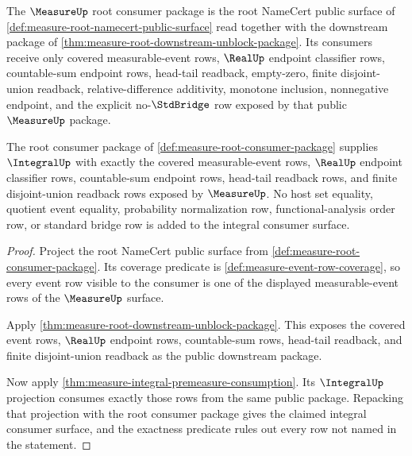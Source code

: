 \begin{definition}
\label{def:measure-root-consumer-package}
The $\MeasureUp$ root consumer package is the root NameCert public surface of
\autoref{def:measure-root-namecert-public-surface} read together with the
downstream package of
\autoref{thm:measure-root-downstream-unblock-package}. Its consumers receive
only covered measurable-event rows, $\RealUp$ endpoint classifier rows,
countable-sum endpoint rows, head-tail readback, empty-zero, finite
disjoint-union readback, relative-difference additivity, monotone inclusion,
nonnegative endpoint, and the explicit no-$\StdBridge$ row exposed by that
public $\MeasureUp$ package.
\end{definition}

\begin{theorem}
\label{thm:measure-integral-consumer-rows}
The root consumer package of
\autoref{def:measure-root-consumer-package} supplies $\IntegralUp$ with
exactly the covered measurable-event rows, $\RealUp$ endpoint classifier rows,
countable-sum endpoint rows, head-tail readback rows, and finite
disjoint-union readback rows exposed by $\MeasureUp$. No host set equality,
quotient event equality, probability normalization row, functional-analysis
order row, or standard bridge row is added to the integral consumer surface.
\end{theorem}
\begin{proof}
Project the root NameCert public surface from
\autoref{def:measure-root-consumer-package}. Its coverage predicate is
\autoref{def:measure-event-row-coverage}, so every event row visible to the
consumer is one of the displayed measurable-event rows of the $\MeasureUp$
surface.

Apply \autoref{thm:measure-root-downstream-unblock-package}. This exposes the
covered event rows, $\RealUp$ endpoint rows, countable-sum rows, head-tail
readback, and finite disjoint-union readback as the public downstream package.

Now apply \autoref{thm:measure-integral-premeasure-consumption}. Its
$\IntegralUp$ projection consumes exactly those rows from the same public
package. Repacking that projection with the root consumer package gives the
claimed integral consumer surface, and the exactness predicate rules out every
row not named in the statement.
\end{proof}


